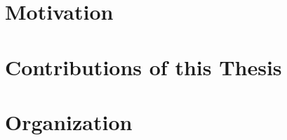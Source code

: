 \section{Motivation}
\label{motivation}


\section{Contributions of this Thesis}
\label{contributions}


\section{Organization}
\label{organization}


\begin{comment}
\section{Schedule}
\label{schedule}

\end{comment}